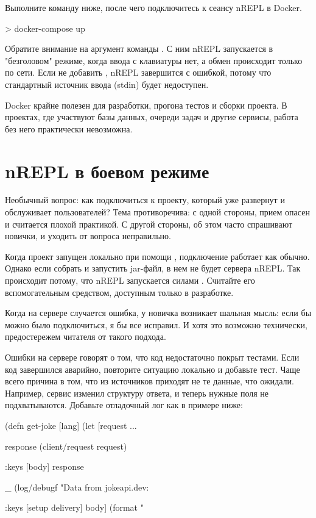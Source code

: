 Выполните команду ниже, после чего подключитесь к сеансу nREPL в Docker.

\begin{english}
  \begin{bash}
> docker-compose up
  \end{bash}
\end{english}

Обратите внимание на аргумент  команды . С ним nREPL запускается в "безголовом" режиме, когда ввода с клавиатуры нет, а обмен происходит только по сети. Если не добавить , nREPL завершится с ошибкой, потому что стандартный источник ввода (stdin) будет недоступен.

Docker крайне полезен для разработки, прогона тестов и сборки проекта. В проектах, где участвуют базы данных, очереди задач и другие сервисы, работа без него практически невозможна.

\section{nREPL в боевом режиме}

Необычный вопрос: как подключиться к проекту, который уже развернут и обслуживает пользователей? Тема противоречива: с одной стороны, прием опасен и считается плохой практикой. С другой стороны, об этом часто спрашивают новички, и уходить от вопроса неправильно.

Когда проект запущен локально при помощи , подключение работает как обычно. Однако если собрать и запустить jar-файл, в нем не будет сервера nREPL. Так происходит потому, что nREPL запускается силами . Считайте его вспомогательным средством, доступным только в разработке.

Когда на сервере случается ошибка, у новичка возникает шальная мысль: если бы можно было подключиться, я бы все исправил. И хотя это возможно технически, предостережем читателя от такого подхода.

Ошибки на сервере говорят о том, что код недостаточно покрыт тестами. Если код завершился аварийно, повторите ситуацию локально и добавьте тест. Чаще всего причина в том, что из источников приходят не те данные, что ожидали. Например, сервис  изменил структуру ответа, и теперь нужные поля не подхватываются. Добавьте отладочный лог как в примере ниже:

\begin{english}
  \begin{clojure}
(defn get-joke [lang]
  (let [request
        {...}

        response
        (client/request request)

        {:keys [body]}
        response

        _ (log/debugf "Data from jokeapi.dev: %

        {:keys [setup delivery]}
        body]
    (format "%
  \end{clojure}
\end{english}

